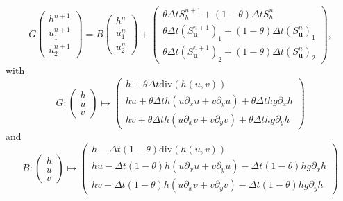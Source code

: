 \documentclass[a4paper, 11pt]{article}
\begin{document}
\begin{equation*}
G\begin{pmatrix}h^{n+1}\\u_1^{n+1}\\u_2^{n+1}\end{pmatrix}=B\begin{pmatrix}h^n\\u_1^n\\u_2^n\end{pmatrix}+\begin{pmatrix}\theta \Delta tS_h^{n+1}+(1-\theta)\Delta tS_h^{n}\\ \theta \Delta t\left(S_{\boldsymbol{u}}^{n+1}\right)_1+(1-\theta)\Delta t\left(S_{\boldsymbol{u}}^n\right)_1\\ \theta \Delta t\left(S_{\boldsymbol{u}}^{n+1}\right)_2+(1-\theta)\Delta t\left(S_{\boldsymbol{u}}^n\right)_2\end{pmatrix},
\end{equation*}
with 
\begin{equation*}
G:\begin{pmatrix}h\\u\\v\end{pmatrix}\mapsto\begin{pmatrix}h+\theta\Delta t\text{div}\left(h(u,v)\right)\\
hu+\theta\Delta t h\left(u\partial_xu+v\partial_yu\right)+\theta \Delta thg\partial_x h\\
hv+\theta\Delta t h\left(u\partial_xv+v\partial_yv\right)+\theta \Delta thg\partial_y h
\end{pmatrix}
\end{equation*}
and
\begin{equation*}
B:
\begin{pmatrix}
h\\u\\v
\end{pmatrix}\mapsto\begin{pmatrix}h-\Delta t(1-\theta)\text{div}(h(u,v))\\
hu-\Delta t(1-\theta)h\left(u\partial_xu+v\partial_yu\right)-\Delta t(1-\theta)hg\partial_x h\\
hv-\Delta t(1-\theta)h\left(u\partial_xv+v\partial_yv\right)-\Delta t(1-\theta)hg\partial_y h
\end{pmatrix}
\end{equation*}
\end{document}
